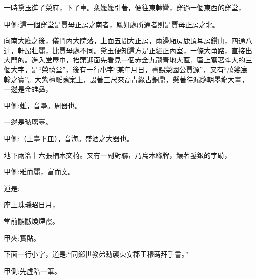 \begin{parag}
    一時黛玉進了榮府，下了車。衆嬤嬤引著，便往東轉彎，穿過一個東西的穿堂，\begin{note}甲側:這一個穿堂是賈母正房之南者，鳳姐處所通者則是賈母正房之北。\end{note}向南大廳之後，儀門內大院落，上面五間大正房，兩邊廂房鹿頂耳房鑽山，四通八達，軒昂壯麗，比賈母處不同。黛玉便知這方是正經正內室，一條大甬路，直接出大門的。進入堂屋中，抬頭迎面先看見一個赤金九龍青地大匾，匾上寫著斗大的三個大字，是“榮禧堂”，後有一行小字“某年月日，書賜榮國公賈源”，又有“萬幾宸翰之寶”。大紫檀雕螭案上，設著三尺來高青綠古銅鼎，懸著待漏隨朝墨龍大畫，一邊是金蜼彝，\begin{note}甲側:蜼，音壘。周器也。\end{note}一邊是玻璃臺。\begin{note}甲側:（上臺下皿），音海。盛酒之大器也。\end{note}地下兩溜十六張楠木交椅。又有一副對聯，乃烏木聯牌，鑲著鏨銀的字跡，\begin{note}甲側:雅而麗，富而文。\end{note}道是:
\end{parag}


\begin{poem}
    \begin{pl} 座上珠璣昭日月，\end{pl}

    \begin{pl}堂前黼黻煥煙霞。\end{pl}\begin{note}甲夾:實貼。\end{note}
\end{poem}


\begin{parag}
    下面一行小字，道是:“同鄉世教弟勳襲東安郡王穆蒔拜手書。”\begin{note}甲側:先虛陪一筆。\end{note}
\end{parag}


